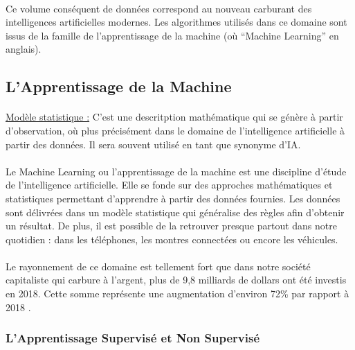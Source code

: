 \documentclass[10pt, french, a4paper]{report}
\begin{document}
\paragraph{}
Ce volume conséquent de données correspond au nouveau carburant des intelligences artificielles modernes. Les algorithmes utilisés dans ce domaine sont issus de la famille de l'apprentissage de la machine (où ``Machine Learning'' en anglais).

\subsection{L'Apprentissage de la Machine}

\paragraph{}
\underline{Modèle statistique :} C’est une descritption mathématique qui se génère à partir d’observation, où plus précisément dans le domaine de l’intelligence artificielle à partir des données. Il sera souvent utilisé en tant que synonyme d’IA.

\paragraph{}
Le Machine Learning ou l'apprentissage de la machine est une discipline d'étude de l'intelligence artificielle. Elle se fonde sur des approches mathématiques et statistiques permettant d'apprendre à partir des données fournies. Les données sont délivrées dans un modèle statistique qui généralise des règles afin d'obtenir un résultat. De plus, il est possible de la retrouver presque partout dans notre quotidien : dans les téléphones, les montres connectées ou encore les véhicules.

\paragraph{}
Le rayonnement de ce domaine est tellement fort que dans notre société capitaliste qui carbure à l'argent, plus de 9,8 milliards de dollars ont été investis en 2018. Cette somme représente une augmentation d'environ 72\% par rapport à 2018 \citep{columbus_25_2019}.

\subsubsection{L'Apprentissage Supervisé et Non Supervisé}
\end{document}
